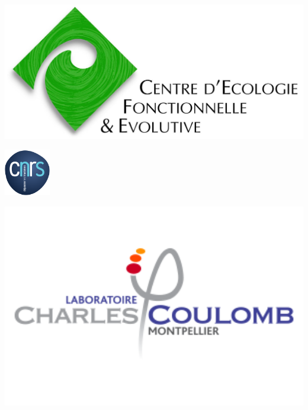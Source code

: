 \begin{center}
\begin{minipage}{0.3\textwidth}
	\begin{center}
		\includegraphics[width=1\textwidth]{img/logo-cefe}
	\end{center}
\end{minipage}
\includegraphics[width=0.15\textwidth]{img/logo-cnrs}
\begin{minipage}{0.35\textwidth}
	\begin{center}
		\includegraphics[width=1\textwidth]{img/logo-l2c}
	\end{center}
\end{minipage}

\vfill

\end{center}

\clearpage
\newpage
